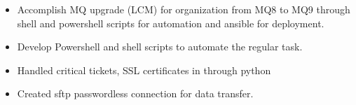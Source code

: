 \documentclass[10pt,a4paper,ragged2e,withhyper]{altacv}
\begin{document}
\begin{paracol}{2}
\begin{itemize}
\item Accomplish MQ upgrade (LCM) for organization from MQ8 to MQ9 through shell and powershell scripts for automation and ansible for deployment. 
\item Develop Powershell and shell scripts to automate the regular task. 
\item Handled critical tickets, SSL certificates in through python 
\item Created sftp passwordless connection for data transfer.
\end{itemize}

\medskip






\nocite{*}

\printbibliography[heading=pubtype,title={\printinfo{\faFile*[regular]}{Articles}},type=article]

\divider


\switchcolumn


\end{paracol}
\end{document}

